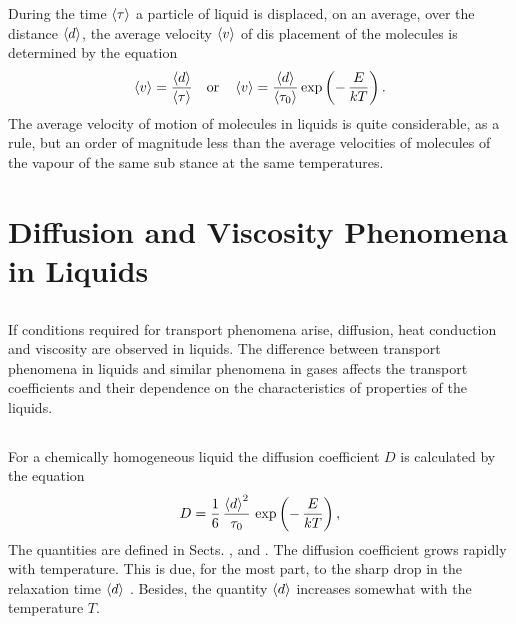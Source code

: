 During the time $\expval{\tau}$ a particle of liquid is displaced, on an average, over the distance $\expval{d}$, the average velocity $\expval{v}$ of dis­ placement of the molecules is determined by the equation
\begin{equation*}%
\expval{v}  = \frac{\expval{d} }{\expval{\tau} }  \qor \expval{v}  = \frac{\expval{d} }{\expval{\tau_{0}} }   \exp \left(- \, \frac{E}{kT} \right).
\end{equation*}
The average velocity of motion of molecules in liquids is quite considerable, as a rule, but an order of magnitude less than the average velocities of molecules of the vapour of the same sub­ stance at the same temperatures.


\section{Diffusion and Viscosity Phenomena in Liquids}
\label{sec-13.3}

\subsection{}\label{13.3.1} If conditions required for transport phenomena  arise, diffusion, heat conduction and viscosity are observed in liquids. The difference between transport phenomena in liquids and similar phenomena in gases affects the transport coefficients and their dependence on the characteristics of properties of the liquids.

\subsection{}\label{13.3.2} For a chemically homogeneous liquid the diffusion coefficient $D$  is calculated by the equation
\begin{equation*}%
D = \frac{1}{6} \, \frac{\expval{d}^{2}}{\tau_{0}} \, \exp \left(- \, \frac{E}{kT} \right),
\end{equation*}
The quantities are defined in Sects. ,  and . The diffusion coefficient grows rapidly with temperature. This is due, for the most part, to the sharp drop in the relaxation time $\expval{d}$ . Besides, the quantity $\expval{d}$  increases somewhat with the temperature $T$.



